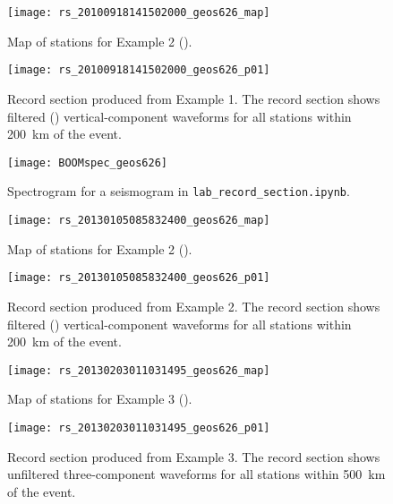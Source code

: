 \documentclass[11pt,titlepage,fleqn]{article}
\newcommand{\tfile}{{\tt lab\_record\_section.ipynb}}
\begin{document}

\clearpage\pagebreak
\begin{figure}
\centering
\texttt{[image: rs\_20100918141502000\_geos626\_map]}
\caption[]
{{
Map of stations for Example 2 ().
}}
\label{fig:map_ex01}
\end{figure}

\clearpage\pagebreak
\begin{figure}
\hspace{-1.25cm}
\texttt{[image: rs\_20100918141502000\_geos626\_p01]}
\caption[]
{{
Record section produced from Example 1.
The record section shows filtered () vertical-component waveforms for all stations within 200~km of the event.
}}
\label{fig:rs_ex01}
\end{figure}

\clearpage\pagebreak
\begin{figure}
\centering
\texttt{[image: BOOMspec\_geos626]}
\caption[]
{{
Spectrogram for a seismogram in \tfile.
}}
\label{fig:BOOM}
\end{figure}


\clearpage\pagebreak
\begin{figure}
\centering
\texttt{[image: rs\_20130105085832400\_geos626\_map]}
\caption[]
{{
Map of stations for Example 2 ().
}}
\label{fig:map_ex02}
\end{figure}

\clearpage\pagebreak
\begin{figure}
\hspace{-1.25cm}
\texttt{[image: rs\_20130105085832400\_geos626\_p01]}
\caption[]
{{
Record section produced from Example 2.
The record section shows filtered () vertical-component waveforms for all stations within 200~km of the event.
}}
\label{fig:rs_ex02}
\end{figure}


\clearpage\pagebreak
\begin{figure}
\centering
\texttt{[image: rs\_20130203011031495\_geos626\_map]}
\caption[]
{{
Map of stations for Example 3 ().
}}
\label{fig:map_ex03}
\end{figure}

\clearpage\pagebreak
\begin{figure}
\hspace{-1.25cm}
\texttt{[image: rs\_20130203011031495\_geos626\_p01]}
\caption[]
{{
Record section produced from Example 3.
The record section shows unfiltered three-component waveforms for all stations within 500~km of the event.
}}
\label{fig:rs_ex03}
\end{figure}
\end{document}
